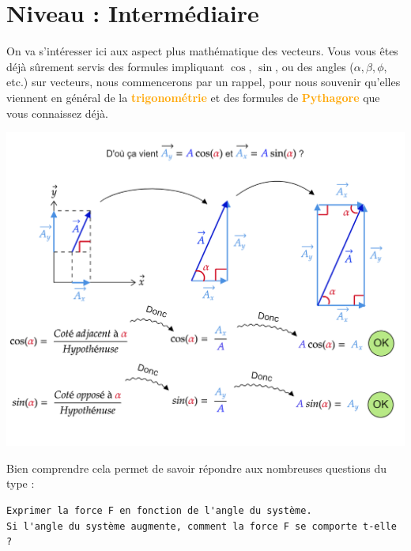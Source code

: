 \documentclass[12pt]{article}
\begin{document}
\newpage

\section{Niveau : Intermédiaire}

On va s'intéresser ici aux aspect plus mathématique des vecteurs. Vous vous êtes déjà sûrement servis des formules impliquant $\cos$, $\sin$, ou des angles ($\alpha, \beta, \phi$, etc.) sur vecteurs, nous commencerons par un rappel, pour nous souvenir qu'elles viennent en général de la \textcolor{orange}{\textbf{trigonométrie}} et des formules de \textcolor{orange}{\textbf{Pythagore}} que vous connaissez déjà.

            \begin{center}
            \includegraphics[width=1\textwidth]{DD8.png}
            \end{center}




Bien comprendre cela permet de savoir répondre aux nombreuses questions du type : 
\begin{verbatim}
Exprimer la force F en fonction de l'angle du système.
Si l'angle du système augmente, comment la force F se comporte t-elle ? 
\end{verbatim}
\end{document}

